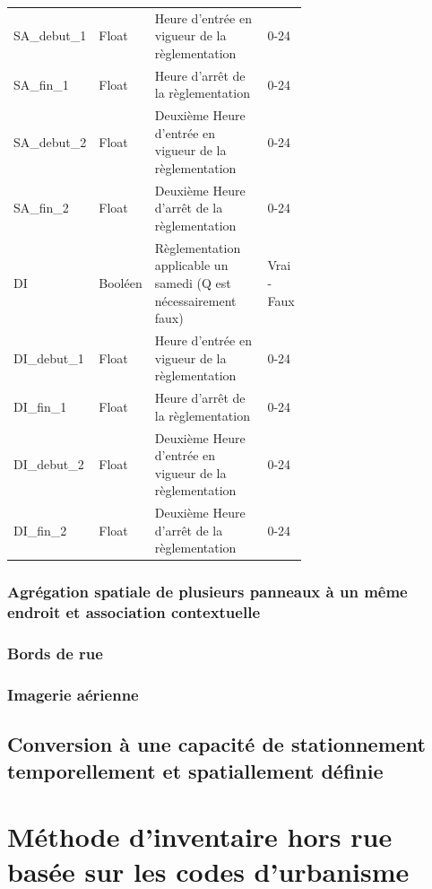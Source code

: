 \begin{longtable}{p{0.15 \linewidth}  l p{0.5\linewidth} l  }
          SA\_debut\_1 & Float & Heure d'entrée en vigueur de la règlementation & 0-24\\
          SA\_fin\_1 & Float & Heure d'arrêt de la règlementation & 0-24\\
          SA\_debut\_2 & Float & Deuxième Heure d'entrée en vigueur de la règlementation & 0-24\\
          SA\_fin\_2 & Float & Deuxième Heure d'arrêt de la règlementation & 0-24 \\
          DI & Booléen & Règlementation applicable un samedi (Q est nécessairement faux) & Vrai - Faux \\
          DI\_debut\_1 & Float & Heure d'entrée en vigueur de la règlementation & 0-24\\
          DI\_fin\_1 & Float & Heure d'arrêt de la règlementation & 0-24\\
          DI\_debut\_2 & Float & Deuxième Heure d'entrée en vigueur de la règlementation & 0-24\\
          DI\_fin\_2 & Float & Deuxième Heure d'arrêt de la règlementation & 0-24 \\  
        \end{longtable}

      \FloatBarrier
      \subsubsection{Agrégation spatiale de plusieurs panneaux à un même endroit et association contextuelle}
    \subsubsection{Bords de rue}
    \subsubsection{Imagerie aérienne}
  \subsection{Conversion à une capacité de stationnement temporellement et spatiallement définie}
\section{Méthode d'inventaire hors rue basée sur les codes d'urbanisme}\label{sec:meth_urb_based_inventory}
